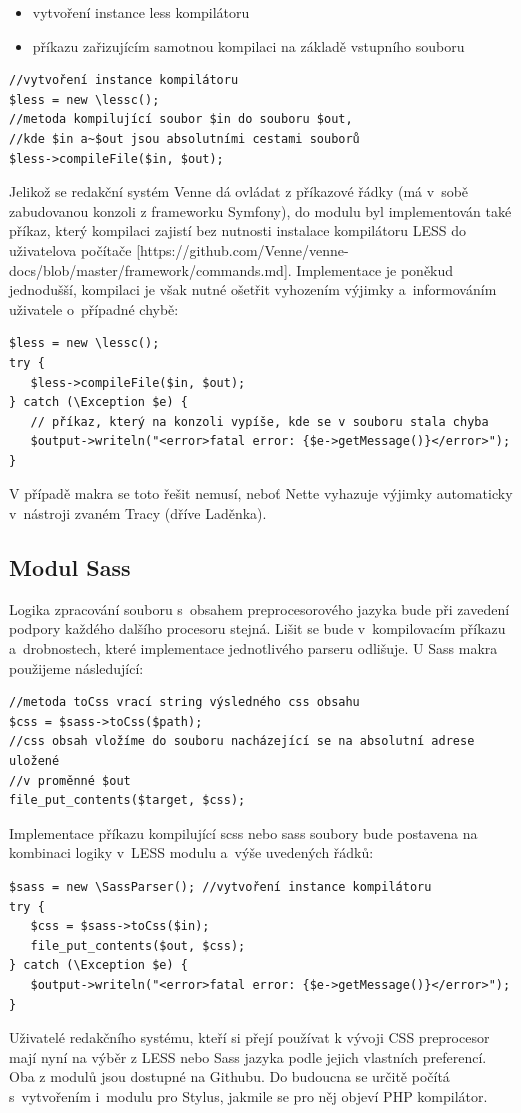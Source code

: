 \documentclass[thesis=B,czech]{FITthesis}[2012/06/26]
\begin{document}
\begin{itemize}
 \item vytvoření instance less kompilátoru
 \item příkazu zařizujícím samotnou kompilaci na základě vstupního souboru
\end{itemize}
\scriptsize
\begin{verbatim}
//vytvoření instance kompilátoru
$less = new \lessc(); 
//metoda kompilující soubor $in do souboru $out, 
//kde $in a~$out jsou absolutními cestami souborů
$less->compileFile($in, $out); 
\end{verbatim}
\normalsize
Jelikož se redakční systém Venne dá ovládat z příkazové řádky (má v~sobě zabudovanou konzoli z frameworku Symfony), do modulu byl implementován také příkaz, který kompilaci zajistí bez nutnosti instalace kompilátoru LESS do uživatelova počítače [https://github.com/Venne/venne-docs/blob/master/framework/commands.md]. Implementace je poněkud jednodušší, kompilaci je však nutné ošetřit vyhozením výjimky a~informováním uživatele o~případné chybě:
\scriptsize
\begin{verbatim}
$less = new \lessc();
try {
   $less->compileFile($in, $out);
} catch (\Exception $e) {
   // příkaz, který na konzoli vypíše, kde se v souboru stala chyba
   $output->writeln("<error>fatal error: {$e->getMessage()}</error>"); 
}
\end{verbatim}
\normalsize
V případě makra se toto řešit nemusí, neboť Nette vyhazuje výjimky automaticky v~nástroji zvaném Tracy (dříve Laděnka).



\subsection{Modul Sass}

Logika zpracování souboru s~obsahem preprocesorového jazyka bude při zavedení podpory každého dalšího procesoru stejná. Lišit se bude v~kompilovacím příkazu a~drobnostech, které implementace jednotlivého parseru odlišuje. U \gls{Sass} makra použijeme následující:	

\scriptsize
\begin{verbatim}
//metoda toCss vrací string výsledného css obsahu
$css = $sass->toCss($path); 
//css obsah vložíme do souboru nacházející se na absolutní adrese uložené 
//v proměnné $out
file_put_contents($target, $css);  
\end{verbatim}
\normalsize
Implementace příkazu kompilující scss nebo sass soubory bude postavena na kombinaci logiky v~LESS modulu a~výše uvedených řádků:
\scriptsize
\begin{verbatim}
$sass = new \SassParser(); //vytvoření instance kompilátoru
try {
   $css = $sass->toCss($in); 	
   file_put_contents($out, $css);
} catch (\Exception $e) {
   $output->writeln("<error>fatal error: {$e->getMessage()}</error>");
}
\end{verbatim}
\normalsize
Uživatelé redakčního systému, kteří si přejí používat k vývoji \gls{CSS} preprocesor mají nyní na výběr z LESS nebo \gls{Sass} jazyka podle jejich vlastních preferencí. Oba z modulů jsou dostupné na Githubu. Do budoucna se určitě počítá s~vytvořením i~modulu pro Stylus, jakmile se pro něj objeví \gls{PHP} kompilátor.
\end{document}
